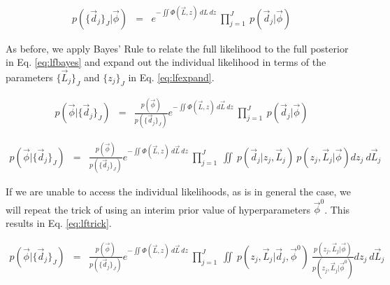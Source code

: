 \documentclass[preprint]{aastex}
\begin{document}
\begin{eqnarray}
\label{eq:lfind}
p(\{\vec{d}_{j}\}_{J}|\vec{\phi}) &=& e^{-\iint \Phi(\vec{L},z)\ dL\ dz}\ \prod_{j=1}^{J}\ p(\vec{d}_{j}|\vec{\phi})
\end{eqnarray}

As before, we apply Bayes' Rule to relate the full likelihood to the full posterior in Eq. \ref{eq:lfbayes} and expand out the individual likelihood in terms of the parameters $\{\vec{L}_{j}\}_{J}$ and $\{z_{j}\}_{J}$ in Eq. \ref{eq:lfexpand}.

\begin{eqnarray}
\label{eq:lfbayes}
p(\vec{\phi}|\{\vec{d}_{j}\}_{J}) &=& \frac{p(\vec{\phi})}{p(\{\vec{d}_{j}\}_{J})}e^{-\iint \Phi(\vec{L},z)\ d\vec{L}\ dz}\ \prod_{j=1}^{J}\ p(\vec{d}_{j}|\vec{\phi})
\end{eqnarray}

\begin{eqnarray}
\label{eq:lfexpand}
p(\vec{\phi}|\{\vec{d}_{j}\}_{J}) &=& \frac{p(\vec{\phi})}{p(\{\vec{d}_{j}\}_{J})}e^{-\iint \Phi(\vec{L},z)\ d\vec{L}\ dz}\ \prod_{j=1}^{J}\ \iint\ p(\vec{d}_{j}|z_{j},\vec{L}_{j})\ p(z_{j},\vec{L}_{j}|\vec{\phi}) dz_{j}\ d\vec{L}_{j}
\end{eqnarray}

If we are unable to access the individual likelihoods, as is in general the case, we will repeat the trick of using an interim prior value of hyperparameters $\vec{\phi}^{0}$.  This results in Eq. \ref{eq:lftrick}.

\begin{eqnarray}
\label{eq:lftrick}
p(\vec{\phi}|\{\vec{d}_{j}\}_{J}) &=& \frac{p(\vec{\phi})}{p(\{\vec{d}_{j}\}_{J})}e^{-\iint \Phi(\vec{L},z)\ d\vec{L}\ dz}\ \prod_{j=1}^{J}\ \iint\ p(z_{j},\vec{L}_{j}|\vec{d}_{j},\vec{\phi}^{0})\ \frac{p(z_{j},\vec{L}_{j}|\vec{\phi})}{p(z_{j},\vec{L}_{j}|\vec{\phi}^{0})} dz_{j}\ d\vec{L}_{j}
\end{eqnarray}


\end{document}
